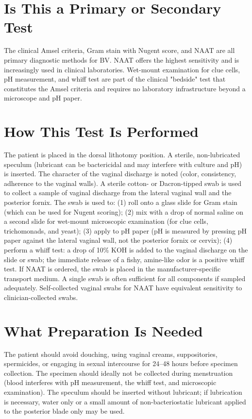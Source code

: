 \section*{Is This a Primary or Secondary Test}
The clinical Amsel criteria, Gram stain with Nugent score, and NAAT are all primary diagnostic methods for BV. NAAT offers the highest sensitivity and is increasingly used in clinical laboratories. Wet-mount examination for clue cells, pH measurement, and whiff test are part of the clinical "bedside" test that constitutes the Amsel criteria and requires no laboratory infrastructure beyond a microscope and pH paper.

\section*{How This Test Is Performed}
The patient is placed in the dorsal lithotomy position. A sterile, non-lubricated speculum (lubricant can be bactericidal and may interfere with culture and pH) is inserted. The character of the vaginal discharge is noted (color, consistency, adherence to the vaginal walls). A sterile cotton- or Dacron-tipped swab is used to collect a sample of vaginal discharge from the lateral vaginal wall and the posterior fornix. The swab is used to: (1) roll onto a glass slide for Gram stain (which can be used for Nugent scoring); (2) mix with a drop of normal saline on a second slide for wet-mount microscopic examination (for clue cells, trichomonads, and yeast); (3) apply to pH paper (pH is measured by pressing pH paper against the lateral vaginal wall, not the posterior fornix or cervix); (4) perform a whiff test: a drop of 10\% KOH is added to the vaginal discharge on the slide or swab; the immediate release of a fishy, amine-like odor is a positive whiff test. If NAAT is ordered, the swab is placed in the manufacturer-specific transport medium. A single swab is often sufficient for all components if sampled adequately. Self-collected vaginal swabs for NAAT have equivalent sensitivity to clinician-collected swabs.

\section*{What Preparation Is Needed}
The patient should avoid douching, using vaginal creams, suppositories, spermicides, or engaging in sexual intercourse for 24--48 hours before specimen collection. The specimen should ideally not be collected during menstruation (blood interferes with pH measurement, the whiff test, and microscopic examination). The speculum should be inserted without lubricant; if lubrication is necessary, water only or a small amount of non-bacteriostatic lubricant applied to the posterior blade only may be used.

